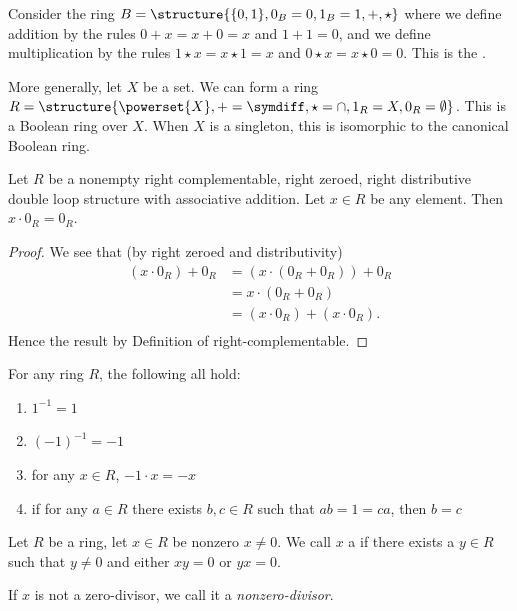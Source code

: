 \begin{example}
Consider the ring $B = \structure{\{0,1\}, 0_{B} = 0, 1_{B} = 1, +, \star}$
where we define addition by the rules $0+x=x+0=x$ and $1+1=0$, and we
define multiplication by the rules $1\star x=x\star 1=x$ and $0\star x=x\star0=0$.
This is the .

More generally, let $X$ be a set. We can form a ring $R=\structure{\powerset{X},+=\symdiff,\star=\cap,1_{R}=X,0_{R}=\emptyset}$.
This is a Boolean ring over $X$. When $X$ is a singleton, this is
isomorphic to the canonical Boolean ring.
\end{example}

\begin{theorem}
Let $R$ be a nonempty right complementable, right zeroed, right
distributive double loop structure with associative addition.
Let $x\in R$ be any element.
Then $x\cdot 0_{R}=0_{R}$.
\end{theorem}

\begin{proof}
We see that (by right zeroed and distributivity)
\begin{equation*}
\begin{aligned}
(x\cdot 0_{R}) + 0_{R} &= (x\cdot(0_{R} + 0_{R})) + 0_{R}\\
&= x\cdot(0_{R} + 0_{R})\\
&= (x\cdot0_{R}) + (x\cdot0_{R}).\\
\end{aligned}
\end{equation*}
Hence the result by Definition of right-complementable.
\end{proof}

\begin{proposition}
For any ring $R$, the following all hold:
\begin{enumerate}
\item $1^{-1}=1$
\item $(-1)^{-1}=-1$
\item for any $x\in R$, $-1\cdot x=-x$
\item if for any $a\in R$ there exists $b,c\in R$ such that $ab=1=ca$,
  then $b=c$
\end{enumerate}
\end{proposition}

\begin{definition}
Let $R$ be a ring, let $x\in R$ be nonzero $x\neq 0$.
We call $x$ a  if there exists a $y\in R$ such
that $y\neq0$ and either $xy=0$ or $yx=0$.

If $x$ is not a zero-divisor, we call it a \emph{nonzero-divisor}.
\end{definition}

